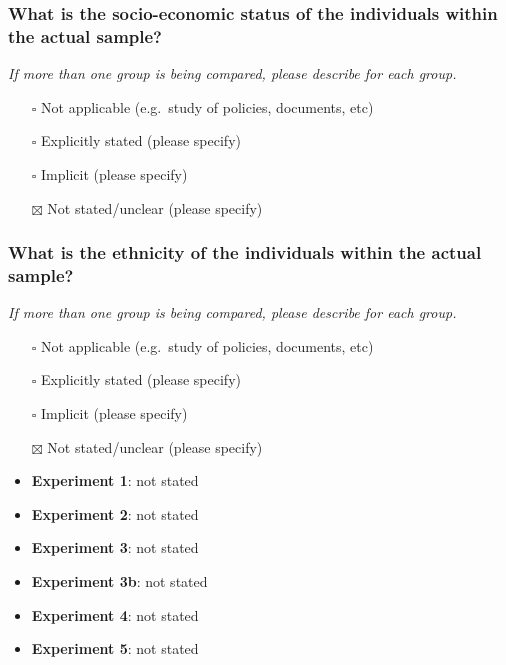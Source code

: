\documentclass[
  doc, a4paper]{apa7}
\providecommand{\tightlist}{%
  \setlength{\itemsep}{0pt}\setlength{\parskip}{0pt}}
\begin{document}
\subsubsection{What is the socio-economic status of the individuals within the actual sample?}\label{what-is-the-socio-economic-status-of-the-individuals-within-the-actual-sample}

\emph{If more than one group is being compared, please describe for each group.}

\begin{itemize}
\tightlist
\item[$\square$]
  Not applicable (e.g.~study of policies, documents, etc)
\item[$\square$]
  Explicitly stated (please specify)
\item[$\square$]
  Implicit (please specify)
\item[$\boxtimes$]
  Not stated/unclear (please specify)
\end{itemize}

\subsubsection{What is the ethnicity of the individuals within the actual sample?}\label{what-is-the-ethnicity-of-the-individuals-within-the-actual-sample}

\emph{If more than one group is being compared, please describe for each group.}

\begin{itemize}
\item[$\square$]
  Not applicable (e.g.~study of policies, documents, etc)
\item[$\square$]
  Explicitly stated (please specify)
\item[$\square$]
  Implicit (please specify)
\item[$\boxtimes$]
  Not stated/unclear (please specify)
\item
  \textbf{Experiment 1}: not stated\\
\item
  \textbf{Experiment 2}: not stated
\item
  \textbf{Experiment 3}: not stated
\item
  \textbf{Experiment 3b}: not stated
\item
  \textbf{Experiment 4}: not stated
\item
  \textbf{Experiment 5}: not stated
\end{itemize}
\end{document}
